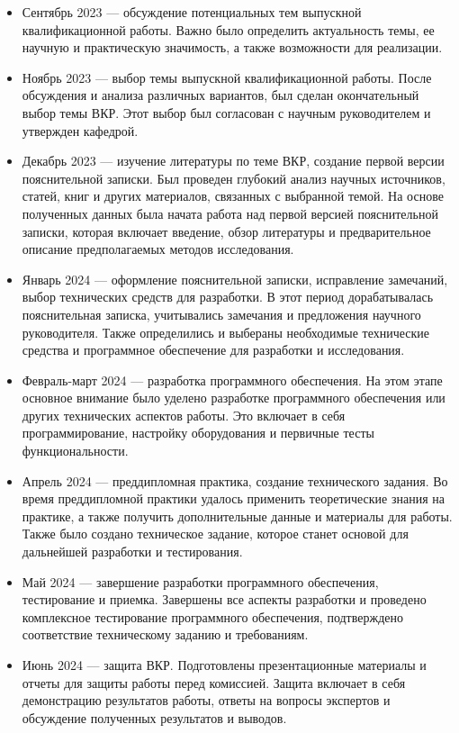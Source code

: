 \documentclass{article}
\begin{document}
    \begin{itemize}
        \item Сентябрь 2023 — обсуждение потенциальных тем выпускной квалификационной работы. Важно было определить актуальность темы, ее научную и практическую значимость, а также возможности для реализации.
        \item Ноябрь 2023 — выбор темы выпускной квалификационной работы. После обсуждения и анализа различных вариантов, был сделан окончательный выбор темы ВКР. Этот выбор был согласован с научным руководителем и утвержден кафедрой.
        \item Декабрь 2023 — изучение литературы по теме ВКР, создание первой версии пояснительной записки. Был проведен глубокий анализ научных источников, статей, книг и других материалов, связанных с выбранной темой. На основе полученных данных была начата работа над первой версией пояснительной записки, которая включает введение, обзор литературы и предварительное описание предполагаемых методов исследования.
        \item Январь 2024 — оформление пояснительной записки, исправление замечаний, выбор технических средств для разработки. В этот период дорабатывалась пояснительная записка, учитывались замечания и предложения научного руководителя. Также определились и выбераны необходимые технические средства и программное обеспечение для разработки и исследования.
        \item Февраль-март 2024 — разработка программного обеспечения. На этом этапе основное внимание было уделено разработке программного обеспечения или других технических аспектов работы. Это включает в себя программирование, настройку оборудования и первичные тесты функциональности.
        \item Апрель 2024 — преддипломная практика, создание технического задания. Во время преддипломной практики удалось применить теоретические знания на практике, а также получить дополнительные данные и материалы для работы. Также было создано техническое задание, которое станет основой для дальнейшей разработки и тестирования.
        \item Май 2024 — завершение разработки программного обеспечения, тестирование и приемка. Завершены все аспекты разработки и проведено комплексное тестирование программного обеспечения, подтверждено соответствие техническому заданию и требованиям.
        \item Июнь 2024 — защита ВКР. Подготовлены презентационные материалы и отчеты для защиты работы перед комиссией. Защита включает в себя демонстрацию результатов работы, ответы на вопросы экспертов и обсуждение полученных результатов и выводов.
    \end{itemize}
    \newpage
\end{document}
